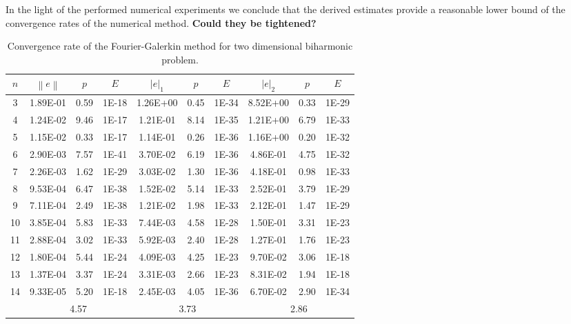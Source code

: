 \documentclass[a4paper,10pt]{article}
\newcommand{\norm}[1]{\ensuremath{\left\|#1\right\|}}
\newcommand{\seminorm}[1]{\ensuremath{\left|#1\right|}}
\begin{document}
  In the light of the performed numerical experiments we conclude that the
  derived estimates provide a reasonable lower bound of the convergence rates
  of the numerical method. \textbf{Could they be tightened?}
  \begin{table}
    \centering
    \begin{tabular}{|c|c|c|c||c|c|c||c|c|c|}
    \hline
    $n$ & $\norm{e}$ & $p$ & $E$ & $\seminorm{e}_1$ & $p$ & $E$ & $\seminorm{e}_2$ & $p$ & $E$\\
\hline
3 & 1.89E-01 & 0.59 & 1E-18 & 1.26E+00 & 0.45 & 1E-34 & 8.52E+00 & 0.33 & 1E-29\\
4 & 1.24E-02 & 9.46 & 1E-17 & 1.21E-01 & 8.14 & 1E-35 & 1.21E+00 & 6.79 & 1E-33\\
5 & 1.15E-02 & 0.33 & 1E-17 & 1.14E-01 & 0.26 & 1E-36 & 1.16E+00 & 0.20 & 1E-32\\
6 & 2.90E-03 & 7.57 & 1E-41 & 3.70E-02 & 6.19 & 1E-36 & 4.86E-01 & 4.75 & 1E-32\\
7 & 2.26E-03 & 1.62 & 1E-29 & 3.03E-02 & 1.30 & 1E-36 & 4.18E-01 & 0.98 & 1E-33\\
8 & 9.53E-04 & 6.47 & 1E-38 & 1.52E-02 & 5.14 & 1E-33 & 2.52E-01 & 3.79 & 1E-29\\
9 & 7.11E-04 & 2.49 & 1E-38 & 1.21E-02 & 1.98 & 1E-33 & 2.12E-01 & 1.47 & 1E-29\\
10 & 3.85E-04 & 5.83 & 1E-33 & 7.44E-03 & 4.58 & 1E-28 & 1.50E-01 & 3.31 & 1E-23\\
11 & 2.88E-04 & 3.02 & 1E-33 & 5.92E-03 & 2.40 & 1E-28 & 1.27E-01 & 1.76 & 1E-23\\
12 & 1.80E-04 & 5.44 & 1E-24 & 4.09E-03 & 4.25 & 1E-23 & 9.70E-02 & 3.06 & 1E-18\\
13 & 1.37E-04 & 3.37 & 1E-24 & 3.31E-03 & 2.66 & 1E-23 & 8.31E-02 & 1.94 & 1E-18\\
14 & 9.33E-05 & 5.20 & 1E-18 & 2.45E-03 & 4.05 & 1E-36 & 6.70E-02 & 2.90 & 1E-34\\
\hline 
    \hline
    & \multicolumn{3}{c||}{4.57} &
      \multicolumn{3}{c||}{3.73} &
      \multicolumn{3}{c|}{2.86}\\
    \hline
    \end{tabular}
    \caption{Convergence rate of the Fourier-Galerkin method for two dimensional
    biharmonic problem.}
    \label{tab:eig_b_2d_0}
  \end{table}
 
\end{document}
